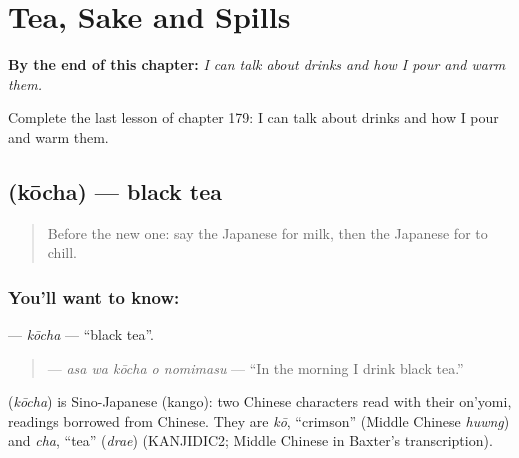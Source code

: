 
\chapter{Tea, Sake and Spills}
\label{ch:ja-tea-sake-and-spills}

\begin{chapteropening}
\textbf{By the end of this chapter:} \emph{I can talk about drinks and how I pour and warm them.}

Complete the last lesson of chapter 179: I can talk about drinks and how I pour and warm them.
\end{chapteropening}

\section[\texorpdfstring{\ja{こうちゃ} (kōcha)}{こうちゃ (kōcha)}]{ (kōcha) — black tea}

\label{lesson:JA-C179-koucha}



\begin{quote}
Before the new one: say the Japanese for milk, then the Japanese for to chill.
\end{quote}

\subsection*{You'll want to know: }
\textbf{} — \emph{kōcha} — \textquotedblleft{}black tea\textquotedblright{}.

\begin{quote}
\textbf{  } — \emph{asa wa kōcha o nomimasu} — \textquotedblleft{}In the morning I drink black tea.\textquotedblright{}
\end{quote}

\begin{cousinweb}
\textbf{} (\emph{kōcha}) is Sino-Japanese (kango): two Chinese characters read with their on'yomi, readings borrowed from Chinese. They are \emph{kō}, \textquotedblleft{}crimson\textquotedblright{} (Middle Chinese \emph{huwng}) and \emph{cha}, \textquotedblleft{}tea\textquotedblright{} (\emph{drae}) (KANJIDIC2; Middle Chinese in Baxter's transcription).
\end{cousinweb}

